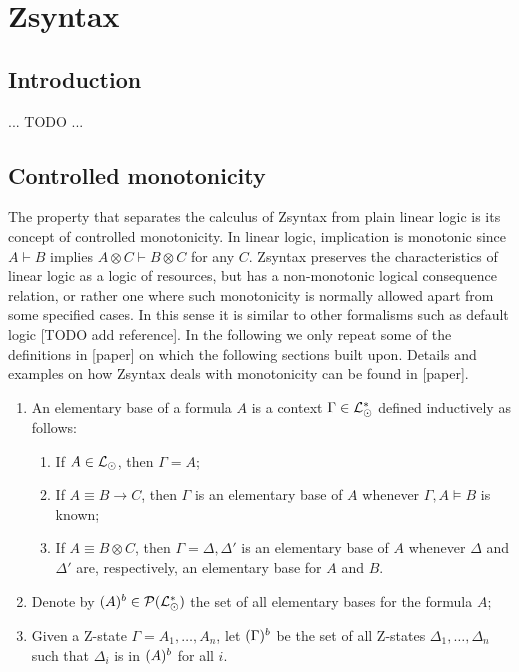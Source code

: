 \section{Zsyntax}

\subsection{Introduction}

... TODO ...

\subsection{Controlled monotonicity}

The property that separates the calculus of Zsyntax from plain linear logic is
its concept of controlled monotonicity. In linear logic, implication is
monotonic since $A \vdash B$ implies $A \otimes C \vdash B \otimes C$ for any
$C$. Zsyntax preserves the characteristics of linear logic as a logic of
resources, but has a non-monotonic logical consequence relation, or rather one
where such monotonicity is normally allowed apart from some specified cases. In
this sense it is similar to other formalisms such as default logic [TODO add
reference]. In the following we only repeat some of the definitions in [paper]
on which the following sections built upon. Details and examples on how Zsyntax
deals with monotonicity can be found in [paper].

\begin{definition}
  \begin{enumerate}
  \item An elementary base of a formula $A$ is a context
    $\Gamma \in \mathcal{L}_{\odot}^*$ defined inductively as follows:

    \begin{enumerate}
    \item If $A \in \mathcal{L}_{\odot}$, then $\Gamma = A$;
    \item If $A \equiv B \rightarrow C$, then $\Gamma$ is an elementary base of
      $A$ whenever $\Gamma, A \models B$ is known;
    \item If $A \equiv B \otimes C$, then $\Gamma = \Delta, \Delta'$ is an
      elementary base of $A$ whenever $\Delta$ and $\Delta'$ are, respectively,
      an elementary base for $A$ and $B$.
    \end{enumerate}

  \item Denote by $(A)^{b} \in \mathcal{P}(\mathcal{L}_{\odot}^*)$ the set of all
    elementary bases for the formula $A$;
  \item Given a Z-state $\Gamma = A_1, \dots, A_n$, let $(\Gamma)^{b}$ be
    the set of all Z-states $\Delta_1, \dots, \Delta_n$ such that $\Delta_i$ is
    in $(A)^{b}$ for all $i$.
  \end{enumerate}
\end{definition}

